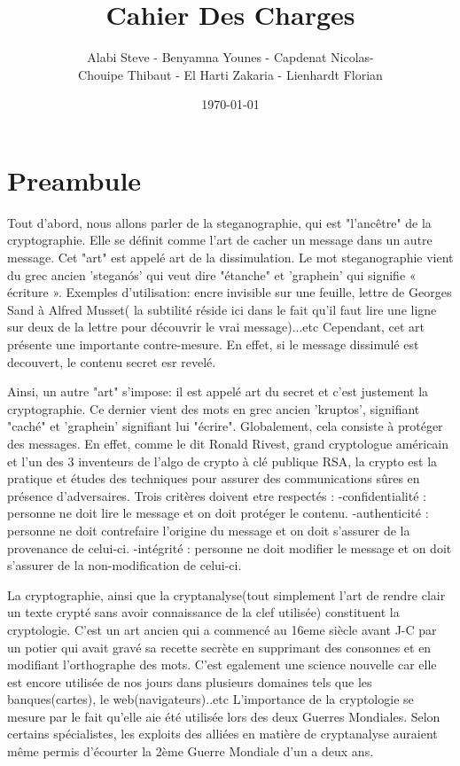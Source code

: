 \documentclass[a4]{article}
\author{Alabi Steve - Benyamna Younes - Capdenat Nicolas- \\
		Chouipe Thibaut - El Harti Zakaria - Lienhardt Florian}
\title{Cahier Des Charges}
\date{\today}
\begin{document}
\maketitle
		\section{Preambule}
				Tout d'abord, nous allons parler de la steganographie, qui est "l'ancêtre" de la cryptographie. Elle se définit comme l'art de cacher un message dans un autre message. Cet "art"
				est appelé art de la dissimulation. Le mot steganographie vient du grec 	ancien 'steganós' qui veut dire "étanche" et 'graphein' qui signifie « écriture ». 		
				Exemples d'utilisation: 
				encre invisible sur une feuille, lettre de Georges Sand à Alfred Musset( la subtilité réside ici dans le fait qu'il faut lire une ligne sur deux de la lettre pour découvrir le vrai message)...etc
				Cependant, cet art présente une importante contre-mesure. En effet, si le message dissimulé est decouvert, le contenu secret esr revelé.

				Ainsi, un autre "art" s'impose: il est appelé art du secret et c'est justement la cryptographie. Ce dernier vient des mots en grec ancien 'kruptos', signifiant "caché" et 'graphein'
				signifiant lui "écrire". Globalement, cela consiste à protéger des messages. En effet, comme le dit Ronald Rivest, grand cryptologue américain et l'un des 3 inventeurs de l'algo
				de crypto à clé publique RSA, la crypto est la pratique et études des techniques pour assurer des communications sûres en présence d'adversaires.
				Trois critères doivent etre respectés : 
				-confidentialité : personne ne doit lire le message et on doit protéger le contenu.
				-authenticité : personne ne doit contrefaire l'origine du message et on doit s'assurer de la 							provenance de celui-ci.
				-intégrité : personne ne doit modifier le message et on doit s'assurer de la non-modification 							de celui-ci.

				La cryptographie, ainsi que la cryptanalyse(tout simplement l'art de rendre clair un texte crypté sans avoir connaissance de la clef utilisée) constituent la cryptologie.
				C'est un art ancien qui a commencé au 16eme siècle avant J-C par un potier qui avait gravé sa recette secrète en supprimant des consonnes et en modifiant l'orthographe des mots.
				C'est egalement une science nouvelle car elle est encore utilisée de nos jours dans plusieurs domaines tels que les banques(cartes), le web(navigateurs)..etc
				L'importance de la cryptologie se mesure par le fait qu'elle aie été utilisée lors des deux Guerres Mondiales. Selon certains spécialistes, les exploits des alliées en matière de cryptanalyse auraient même permis d'écourter la 2ème Guerre Mondiale d'un a deux ans.
\end{document}

